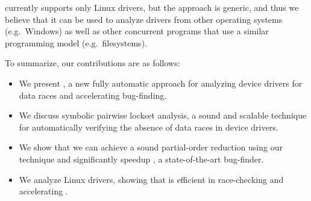 \whoop currently supports only Linux drivers, but the approach is generic, and thus we believe that it can be used to analyze drivers from other operating systems (e.g.\ Windows) as well as other concurrent programs that use a similar programming model (e.g.\ filesystems).

To summarize, our contributions are as follows:
\begin{itemize}
\item We present \whoop, a new fully automatic approach for analyzing device drivers for data races and accelerating bug-finding.
\item We discuss symbolic pairwise lockset analysis,  a sound and scalable technique for automatically verifying the absence of data races in device drivers.
\item We show that we can achieve a sound partial-order reduction using our technique and significantly speedup \corral, a state-of-the-art bug-finder.
\item We analyze \sizeOfBenchmarks Linux drivers, showing that \whoop is efficient in race-checking and accelerating \corral.
\end{itemize}
